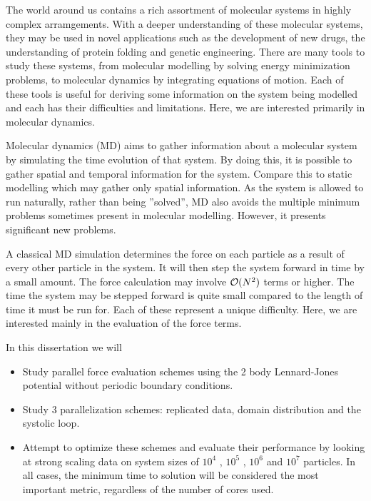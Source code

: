 %
%

The world around us contains
a rich assortment of molecular systems in
highly complex arramgements.
%
With a deeper understanding of these molecular systems,
they may be used in novel applications such as
the development of new drugs,
the understanding of protein folding and
genetic engineering.
%
There are many tools to study these systems,
from molecular modelling by solving energy minimization problems,
to molecular dynamics by integrating equations of motion.
%
Each of these tools is useful for
deriving some information on the system being modelled and
each has their difficulties and limitations.
%
Here, we are interested primarily in molecular dynamics.

Molecular dynamics (MD) aims to
gather information about a molecular system by
simulating the time evolution of that system.
%
By doing this, it is possible to
gather spatial and temporal information for the system.
%
Compare this to static modelling which may gather only spatial information.
%
As the system is allowed to run naturally, rather than being ”solved”,
MD also avoids the multiple minimum problems
sometimes present in molecular modelling.
%
However, it presents significant new problems.

A classical MD simulation determines
the force on each particle as a result of
every other particle in the system.
%
It will then step the system forward in time by a small amount.
%
The force calculation may involve $\mathcal{O}{(N^2)}$ terms or higher.
The time the system may be stepped forward is
quite small compared to the length of time it must be run for.
%
Each of these represent a unique difficulty.
%
Here, we are interested mainly in the evaluation of the force terms.

In this dissertation we will
\begin{itemize}
\item
    Study parallel force evaluation schemes using
    the 2 body Lennard-Jones potential without
    periodic boundary conditions.

\item
    Study 3 parallelization schemes:
    replicated data, domain distribution and the systolic loop.

\item
    Attempt to optimize these schemes and
    evaluate their performance by looking at
    strong scaling data on system sizes of
    $10^4$ , $10^5$ , $10^6$ and $10^7$ particles.
    In all cases, the minimum time to solution will be
    considered the most important metric,
    regardless of the number of cores used.
\end  {itemize}
